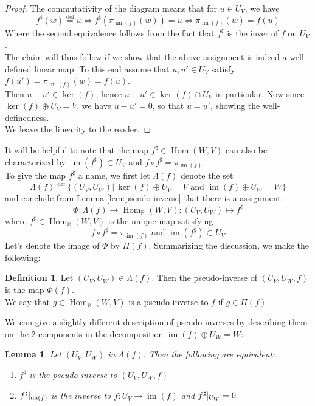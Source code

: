 \documentclass{book}
\theoremstyle{plain}
\newtheorem{lemma}[corollary]{Lemma}
\theoremstyle{definition}
\newtheorem{definition}[corollary]{Definition}
\renewcommand{\d}[1]{\mathbb{#1}}
\newcommand{\define}{\stackrel{\operatorname{def}}{=}}
\newcommand{\ds}{\oplus}
\newcommand{\fun}{\mapsto}
\DeclareMathOperator{\Hom}{Hom}
\DeclareMathOperator{\im}{im}
\newcommand{\mor}{\longrightarrow}
\begin{document}
\begin{proof}
The commutativity of the diagram means that for $u \in U_V$, we have
\[
	f^\sharp(w) \define u\iff f^\sharp(\pi_{\im(f)}(w)) =u\iff \pi_{\im(f)}(w) =f(u)
\]
Where the second equivalence follows from the fact that $f^\sharp$ is the inver of $f$ on $U_V$.\\
The claim will thus follow if we show that the above assignment is indeed a well-defined linear map. To this end assume that $u,u' \in U_V$ satisfy $f(u')=\pi_{\im(f)}(w)=f(u)$.\\ Then $u-u' \in \ker(f)$, hence $u-u' \in \ker(f)\cap U_V$ in particular. Now since $\ker(f)\ds U_V =V$, we have  $u-u'=0$, so that $u=u'$, showing the well-definedness.\\ 
We leave the linearity to the reader.
\end{proof}
It will be helpful to note that the map $f^\sharp\in \Hom(W,V)$ can also be characterized by $\im(f^\sharp)\subset U_V$ and $f\circ f^\sharp =\pi_{\im(f)}$.\\
To give the map $f^\sharp$ a name, we first let $\Lambda(f)$ denote the set
\[
\Lambda(f)\define \{(U_V,U_W)\vert \, \ker(f)\ds U_V=V \textrm{ and } \im(f)\ds U_W =W \}
\]
and conclude from Lemma \ref{lem:pseudo-inverse} that there is a assignment:
\[
\Phi: \Lambda(f)\mor \Hom_\d{R}(W,V):(U_V,U_W)\fun f^\sharp
\]
where $f^\sharp \in \Hom_{\d{R}}(W,V)$ is the unique map satisfying
\[
f \circ f^\sharp = \pi_{\im(f)} \textrm{ and } \im(f^\sharp)\subset U_V
\]
Let's denote the image of $\Phi$ by $\Pi(f)$. Summarizing the discussion, we make the following:
\begin{definition}\label{def:ps}
Let $(U_V,U_W) \in \Lambda(f)$. Then the pseudo-inverse of $(U_V,U_W,f)$ is the map $\Phi(f)$.\\
We say that $g\in \Hom_{\d{R}}(W,V)$ is a pseudo-inverse to $f$ if $g\in \Pi(f)$
\end{definition}

We can give a slightly different description of pseudo-inverses by describing them on the 2 components in the decomposition $\im(f)\ds U_W =W$:


\begin{lemma}\label{lem:pschar2}
Let $(U_V,U_W)$ in $\Lambda(f)$. Then the following are equivalent:
\begin{enumerate}
	\item $f^\sharp$ is the pseudo-inverse to $(U_V,U_W,f)$
	\item $f^\sharp\arrowvert_{\im(f)}$ is the inverse to $f:U_V\mor \im(f)$ and $f^\sharp\arrowvert_{U_W}=0$
\end{enumerate}

\end{lemma}
\end{document}
